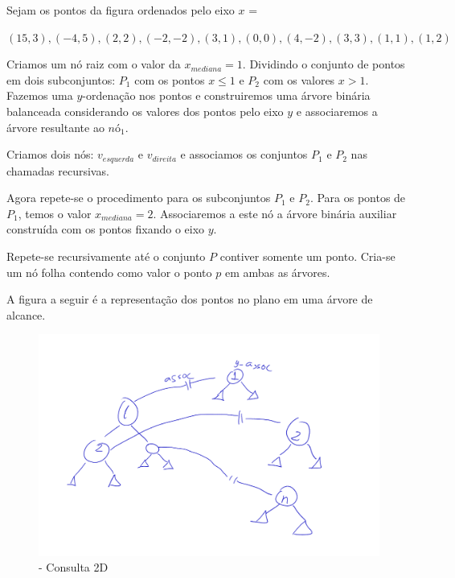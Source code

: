 
Sejam os pontos da figura ordenados pelo eixo $x$ = 

$(15,3),(-4, 5),(2,2),(-2,-2),(3,1),(0,0),(4,-2),(3,3),(1,1),(1,2)$

Criamos um nó raiz com o valor da $x_{mediana} = 1$. Dividindo o conjunto de pontos em dois subconjuntos:
$P_1$ com os pontos $x\leq 1$ e $P_2$ com os valores $x > 1$.
Fazemos uma $y$-ordenação nos pontos e construiremos uma árvore binária balanceada considerando os 
valores dos pontos pelo eixo $y$ e associaremos a árvore resultante ao $nó_1$.


Criamos dois nós: $v_{esquerda}$ e $v_{direita}$ e associamos os conjuntos $P_1$ e $P_2$ nas chamadas
recursivas.

Agora repete-se o procedimento para os subconjuntos $P_1$ e $P_2$.
Para os pontos de $P_1$, temos o valor $x_{mediana} = 2$. Associaremos a este nó a árvore binária auxiliar
construída com os pontos fixando o eixo $y$.

Repete-se recursivamente  até o conjunto $P$ contiver somente um ponto.
Cria-se um nó folha contendo como valor o ponto $p$ em ambas as árvores.

A figura a seguir é a representação dos pontos no plano em uma árvore de alcance.

\begin{figure}[htb]
    \caption{\label{fig:Fig_16} - Consulta 2D}
    \begin{center}
        \includegraphics[width=\textwidth]{images/range_assoc2.pdf}
    \end{center}
\end{figure}



